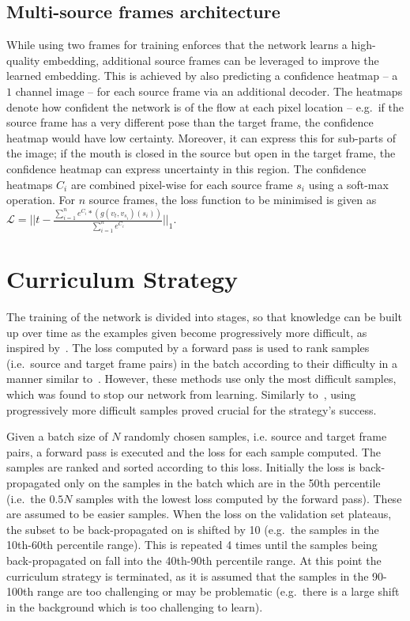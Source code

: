 \documentclass{bmvc2k}
\begin{document}
\subsection{Multi-source frames architecture}
\label{sec:multisource}
While using two frames for training enforces that the network learns a high-quality embedding, additional source frames can be leveraged to improve the learned embedding.
This is achieved by also predicting a confidence heatmap -- a $1$ channel image --  for each source frame via an additional decoder.
The  heatmaps denote how confident the network is of the flow at each pixel location -- e.g.~if the source frame has a very different pose than the target frame, the confidence heatmap would have low certainty.
Moreover, it can express this for sub-parts of the image; if the mouth is closed in the source but open in the target frame, the confidence heatmap can express uncertainty in this region. 
The confidence heatmaps $C_i$ are combined pixel-wise for each source frame $s_i$ using a soft-max operation. 
For $n$ source frames, the loss function to be minimised is given as $\mathcal{L} = ||t - \frac{\sum_{i=1}^n e^{C_i} *  (g(v_t, v_{s_i})  (s_i)) }{\sum_{i=1}^n e^{C_i}} ||_1$. 


\section{Curriculum Strategy}
\label{sec:curriculum}
The training of the network is divided into stages, so that knowledge can be built up over time as the examples given become progressively more difficult, as inspired by~\cite{bengio2009curriculum,Kumar10ours}. 
The loss computed by a forward pass is used to rank samples (i.e.~source and target frame pairs) in the batch according to their difficulty in a manner similar to~\cite{loshchilov2015online,simo2015discriminative,shrivastava2016training,nagrani2018learnable}.
However, these methods use only the most difficult samples, which was found to stop our network from learning. 
Similarly to~\cite{nagrani2018learnable}, using progressively more difficult samples proved crucial for the strategy's success. 




Given a batch size of $N$ randomly chosen samples, i.e. source and target frame pairs, a forward pass is executed and the loss for each sample computed.
The samples are ranked and sorted according to this loss.
Initially the loss is back-propagated only on the samples in the batch which are in the 50th percentile (i.e.~the $0.5N$ samples with the lowest loss computed by the forward pass). These are assumed to be easier samples.
When the loss on the validation set plateaus, the subset to be back-propagated on is shifted by 10 (e.g.~the samples in the 10th-60th percentile range).
This is repeated 4 times until the samples being back-propagated on fall into the 40th-90th percentile range.
At this point the curriculum strategy is terminated, as it is assumed that the samples in the 90-100th range are too challenging or may be problematic (e.g.~there is a large shift in the background which is too challenging to learn).
\end{document}
